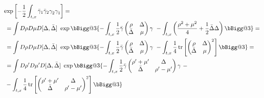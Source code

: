 \documentclass[a4paper,11pt, english]{article}
\makeatletter
\DeclareMathOperator{\tr}{tr}
\theoremstyle{remark}
\newcommand{\ro}{\rho}
\newcommand{\vast}{\bBigg@{3}}
\newcommand{\gammabar}{\bar{\gamma}}
\makeatother
\begin{document}
\begin{subequations}
\label{eq:mHS_matrixHubStrat}
\begin{align}
 &\begin{aligned}
 &\exp\left[-\frac{1}{2}\int_{t,x}\bar{\gamma}_1\bar{\gamma}_2\gamma^{ }_2\gamma_1^{ }\right] = \\
 &\ = \int D\ro D\mu D[\Delta,\bar{\Delta}]\ \exp\vast\{-\int_{t,x} \frac{1}{2}\gammabar 
 \begin{pmatrix}
 \ro & \Delta \\
 \bar{\Delta} & \mu 
 \end{pmatrix}
 \gamma\ - \int_{t,x}\left(\frac{\ro^2+\mu^2}{4} + \frac{1}{2}\bar\Delta\Delta \right)\vast\} = \\
 &\ = \int D\ro D\mu D[\Delta,\bar{\Delta}]\ \exp\vast\{-\int_{t,x} \frac{1}{2}\gammabar 
 \begin{pmatrix}
 \ro & \Delta \\
 \bar{\Delta} & \mu 
 \end{pmatrix}
 \gamma\ - \int_{t,x}\frac{1}{4}\tr\left[
 \begin{pmatrix}
 \ro & \Delta \\
 \bar{\Delta} & \mu 
 \end{pmatrix}^2
 \right]
\vast\} = \\
&\ = \int D\ro' D\mu' D[\Delta,\bar{\Delta}]\ \exp\vast\{-\int_{t,x} \frac{1}{2}\gammabar 
 \begin{pmatrix}
 \ro'+\mu' & \Delta \\
 \bar{\Delta} & \ro'-\mu' 
 \end{pmatrix}
 \gamma\ -\\
 & \ - \int_{t,x}\frac{1}{4}\tr\left[
 \begin{pmatrix}
 \ro'+\mu' & \Delta \\
 \bar{\Delta} & \ro'-\mu' 
 \end{pmatrix}^2
 \right]
 \vast\}
 \end{aligned} \label{eq:mHS_matrixHubStrat_RealAsymmetric}\\[0.8cm]

\end{align}
\end{subequations}
\end{document}
